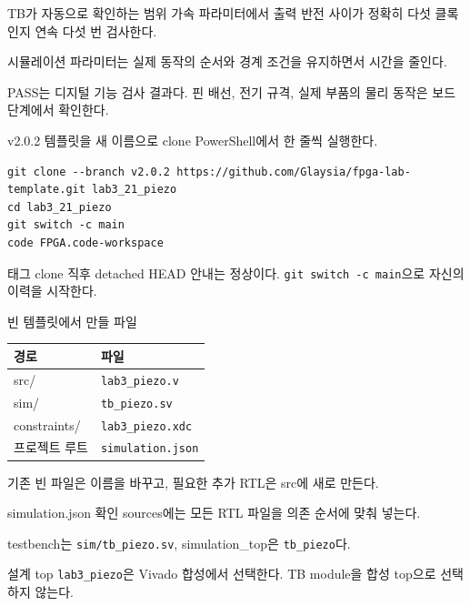 \begin{frame}{TB가 자동으로 확인하는 범위}
\small
가속 파라미터에서 출력 반전 사이가 정확히 다섯 클록인지 연속 다섯 번 검사한다.\par\vspace{0.28cm}
시뮬레이션 파라미터는 실제 동작의 순서와 경계 조건을 유지하면서 시간을 줄인다.\par\vspace{0.28cm}
PASS는 디지털 기능 검사 결과다. 핀 배선, 전기 규격, 실제 부품의 물리 동작은 보드 단계에서 확인한다.
\end{frame}

\begin{frame}[fragile,label=start]{v2.0.2 템플릿을 새 이름으로 clone}
\small
PowerShell에서 한 줄씩 실행한다.
\begin{lstlisting}[language={}]
git clone --branch v2.0.2 https://github.com/Glaysia/fpga-lab-template.git lab3_21_piezo
cd lab3_21_piezo
git switch -c main
code FPGA.code-workspace
\end{lstlisting}
태그 clone 직후 detached HEAD 안내는 정상이다. \texttt{git switch -c main}으로 자신의 이력을 시작한다.
\end{frame}

\begin{frame}{빈 템플릿에서 만들 파일}
\small
\begin{center}\renewcommand{\arraystretch}{1.35}\begin{tabular}{>{\raggedright\arraybackslash}p{2.25cm}p{7.2cm}}
경로 & 파일\\\hline
src/ & \texttt{lab3\_piezo.v}\\
sim/ & \texttt{tb\_piezo.sv}\\
constraints/ & \texttt{lab3\_piezo.xdc}\\
프로젝트 루트 & \texttt{simulation.json}\\
\end{tabular}\end{center}
기존 빈 파일은 이름을 바꾸고, 필요한 추가 RTL은 src에 새로 만든다.
\end{frame}

\begin{frame}{simulation.json 확인}
\small
sources에는 모든 RTL 파일을 의존 순서에 맞춰 넣는다.\par\vspace{0.25cm}
testbench는 \texttt{sim/tb\_piezo.sv}, simulation\_top은 \texttt{tb\_piezo}다.\par\vspace{0.25cm}
설계 top \texttt{lab3\_piezo}은 Vivado 합성에서 선택한다. TB module을 합성 top으로 선택하지 않는다.
\end{frame}

